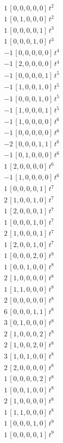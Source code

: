 \begin{align*}
1\,[0,0,0,0,0]\,t^{2} \\
1\,[0,1,0,0,0]\,t^{2} \\
1\,[0,0,0,0,1]\,t^{3} \\
1\,[0,0,0,1,0]\,t^{3} \\
-1\,[0,0,0,0,0]\,t^{4} \\
-1\,[2,0,0,0,0]\,t^{4} \\
-1\,[0,0,0,0,1]\,t^{5} \\
-1\,[1,0,0,1,0]\,t^{5} \\
-1\,[0,0,0,1,0]\,t^{5} \\
-1\,[1,0,0,0,1]\,t^{5} \\
-1\,[1,0,0,0,0]\,t^{6} \\
-1\,[0,0,0,0,0]\,t^{6} \\
-2\,[0,0,0,1,1]\,t^{6} \\
-1\,[0,1,0,0,0]\,t^{6} \\
1\,[2,0,0,0,0]\,t^{6} \\
-1\,[1,0,0,0,0]\,t^{6} \\
1\,[0,0,0,0,1]\,t^{7} \\
2\,[1,0,0,1,0]\,t^{7} \\
1\,[2,0,0,0,1]\,t^{7} \\
1\,[0,0,0,1,0]\,t^{7} \\
2\,[1,0,0,0,1]\,t^{7} \\
1\,[2,0,0,1,0]\,t^{7} \\
1\,[0,0,0,2,0]\,t^{8} \\
1\,[0,0,1,0,0]\,t^{8} \\
2\,[1,0,0,0,0]\,t^{8} \\
1\,[1,1,0,0,0]\,t^{8} \\
2\,[0,0,0,0,0]\,t^{8} \\
6\,[0,0,0,1,1]\,t^{8} \\
3\,[0,1,0,0,0]\,t^{8} \\
2\,[1,0,0,0,2]\,t^{8} \\
2\,[1,0,0,2,0]\,t^{8} \\
3\,[1,0,1,0,0]\,t^{8} \\
2\,[2,0,0,0,0]\,t^{8} \\
1\,[0,0,0,0,2]\,t^{8} \\
1\,[0,0,1,0,0]\,t^{8} \\
2\,[1,0,0,0,0]\,t^{8} \\
1\,[1,1,0,0,0]\,t^{8} \\
1\,[0,0,0,1,0]\,t^{9} \\
1\,[0,0,0,0,1]\,t^{9} \\

\end{align*}
